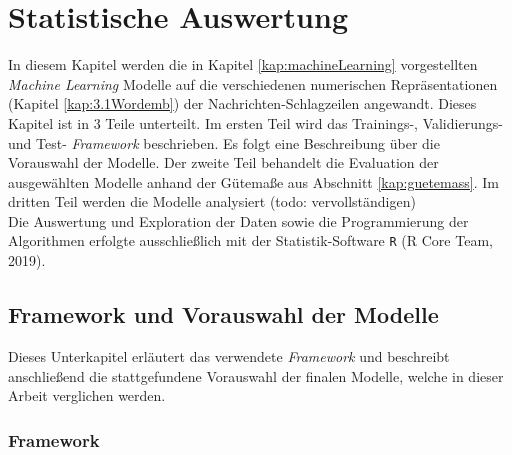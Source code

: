 \documentclass[a4paper,11pt]{article}
\begin{document}
\section{Statistische Auswertung}\label{Kap:statAus}

In diesem Kapitel werden die in Kapitel \ref{kap:machineLearning} vorgestellten \textit{Machine Learning} Modelle auf die verschiedenen numerischen Repräsentationen (Kapitel \ref{kap:3.1Wordemb}) der Nachrichten-Schlagzeilen angewandt. Dieses Kapitel ist in $3$ Teile unterteilt. Im ersten Teil wird das Trainings-, Validierungs- und Test- \textit{Framework} beschrieben. Es folgt eine Beschreibung über die Vorauswahl der Modelle. Der zweite Teil behandelt die Evaluation der ausgewählten Modelle anhand der Gütemaße aus Abschnitt \ref{kap:guetemass}. Im dritten Teil werden die Modelle analysiert (todo: vervollständigen)\\
Die Auswertung und Exploration der Daten sowie die Programmierung der Algorithmen erfolgte ausschließlich mit der Statistik-Software \texttt{R} (R Core Team, 2019).

\subsection{Framework und Vorauswahl der Modelle}

Dieses Unterkapitel erläutert das verwendete \textit{Framework} und beschreibt anschließend die stattgefundene Vorauswahl der finalen Modelle, welche in dieser Arbeit verglichen werden.

\subsubsection{Framework}
\end{document}
